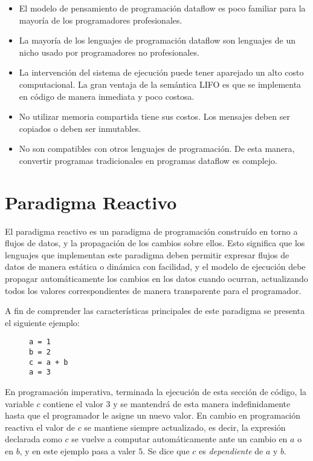 \begin{itemize}
  \item El modelo de pensamiento de programación dataflow es poco familiar para
  la mayoría de los programadores profesionales.
  \item La mayoría de los lenguajes de programación dataflow son lenguajes de
  un nicho usado por programadores no profesionales.
  \item La intervención del sistema de ejecución puede tener aparejado un alto
  costo computacional. La gran ventaja de la semántica LIFO es que se implementa
  en código de manera inmediata y poco costosa.
  \item No utilizar memoria compartida tiene sus costos. Los mensajes deben ser
  copiados o deben ser inmutables.
  \item No son compatibles con otros lenguajes de programación. De esta
  manera, convertir programas tradicionales en programas dataflow es complejo.
\end{itemize}

\section{Paradigma Reactivo}

El paradigma reactivo es un paradigma de programación construído en torno a
flujos de datos, y la propagación de los cambios sobre ellos. Esto significa que
los lenguajes que implementan este paradigma deben permitir expresar flujos de
datos de manera estática o dinámica con facilidad, y el modelo de ejecución
debe propagar automáticamente los cambios en los datos cuando ocurran,
actualizando todos los valores correspondientes de manera transparente para el
programador.

A fin de comprender las características principales de este paradigma se
presenta el siguiente ejemplo:

\begin{figure}[h!]
\centering
\begin{verbatim}
a = 1
b = 2
c = a + b
a = 3
\end{verbatim}
\end{figure}

En programación imperativa, terminada la ejecución de esta sección de código,
la variable $c$ contiene el valor $3$ y se mantendrá de esta manera
indefinidamente hasta que el programador le asigne un nuevo valor. En cambio en
programación reactiva el valor de $c$ se mantiene siempre actualizado, es
decir, la expresión declarada como $c$ se vuelve a computar automáticamente
ante un cambio en $a$ o en $b$, y en este ejemplo pasa a valer $5$. Se dice que
$c$ es \textit{dependiente} de $a$ y $b$.
\cite{Bainomugisha:2013:SRP:2501654.2501666}

